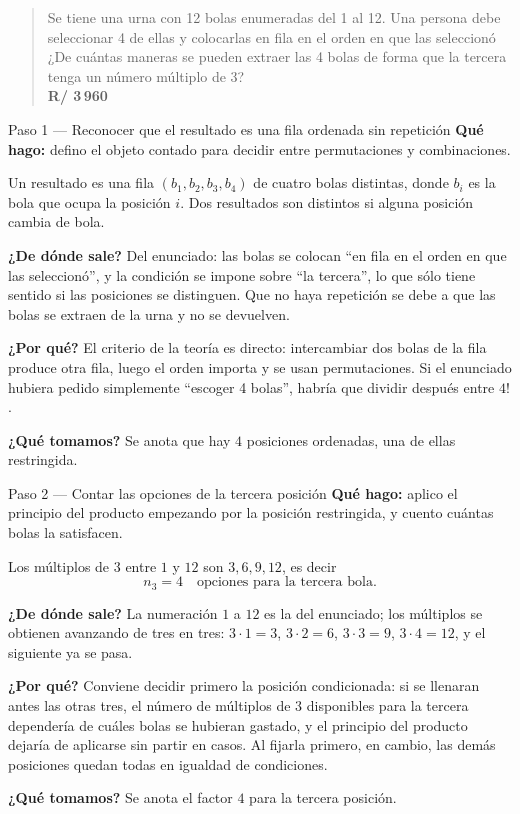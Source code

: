 \documentclass[11pt]{article}
\begin{document}
\begin{quote}
Se tiene una urna con 12 bolas enumeradas del 1 al 12. Una persona debe seleccionar 4 de ellas y colocarlas en fila en el orden en que las seleccionó ¿De cuántas maneras se pueden extraer las 4 bolas de forma que la tercera tenga un número múltiplo de 3?\\[2pt]
\textbf{R/ 3\,960}
\end{quote}

\begin{paso}{Paso 1 --- Reconocer que el resultado es una fila ordenada sin repetición}
\textbf{Qué hago:} defino el objeto contado para decidir entre permutaciones y combinaciones.

Un resultado es una fila $(b_1,b_2,b_3,b_4)$ de cuatro bolas distintas, donde $b_i$ es la bola que ocupa la posición $i$. Dos resultados son distintos si alguna posición cambia de bola.

\textbf{¿De dónde sale?} Del enunciado: las bolas se colocan ``en fila en el orden en que las seleccionó'', y la condición se impone sobre ``la tercera'', lo que sólo tiene sentido si las posiciones se distinguen. Que no haya repetición se debe a que las bolas se extraen de la urna y no se devuelven.

\textbf{¿Por qué?} El criterio de la teoría es directo: intercambiar dos bolas de la fila produce otra fila, luego el orden importa y se usan permutaciones. Si el enunciado hubiera pedido simplemente ``escoger 4 bolas'', habría que dividir después entre $4!$.

\textbf{¿Qué tomamos?} Se anota que hay $4$ posiciones ordenadas, una de ellas restringida.
\end{paso}

\begin{paso}{Paso 2 --- Contar las opciones de la tercera posición}
\textbf{Qué hago:} aplico el principio del producto empezando por la posición restringida, y cuento cuántas bolas la satisfacen.

Los múltiplos de $3$ entre $1$ y $12$ son $3,6,9,12$, es decir
\[
  n_3 = 4 \quad\text{opciones para la tercera bola.}
\]

\textbf{¿De dónde sale?} La numeración $1$ a $12$ es la del enunciado; los múltiplos se obtienen avanzando de tres en tres: $3\cdot 1=3$, $3\cdot 2=6$, $3\cdot 3=9$, $3\cdot 4=12$, y el siguiente ya se pasa.

\textbf{¿Por qué?} Conviene decidir primero la posición condicionada: si se llenaran antes las otras tres, el número de múltiplos de $3$ disponibles para la tercera dependería de cuáles bolas se hubieran gastado, y el principio del producto dejaría de aplicarse sin partir en casos. Al fijarla primero, en cambio, las demás posiciones quedan todas en igualdad de condiciones.

\textbf{¿Qué tomamos?} Se anota el factor $4$ para la tercera posición.
\end{paso}
\end{document}
